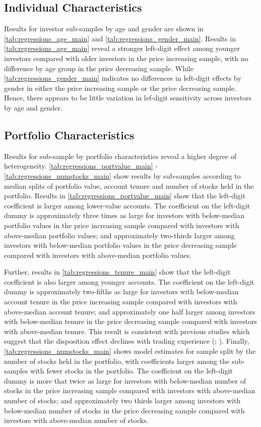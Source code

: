 \subsection{Individual Characteristics}

Results for investor sub-samples by age and gender are shown in \ref{tab:regressions_age_main} and \ref{tab:regressions_gender_main}. Results in \ref{tab:regressions_age_main} reveal a stronger left-digit effect among younger investors compared with older investors in the price increasing sample, with no difference by age group in the price decreasing sample. While \ref{tab:regressions_gender_main} indicates no differences in left-digit effects by gender in either the price increasing sample or the price decreasing sample. Hence, there appears to be little variation in lef-digit sensitivity across investors by age and gender.

\subsection{Portfolio Characteristics}

Results for sub-sample by portfolio characteristics reveal a higher degree of heterogeneity. \ref{tab:regressions_portvalue_main} - \ref{tab:regressions_numstocks_main} show results by sub-samples according to median splits of portfolio value, account tenure and number of stocks held in the portfolio. Results in \ref{tab:regressions_portvalue_main} show that the left-digit coefficient is larger among lower-value accounts. The coefficient on the left-digit dummy is approximately three times as large for investors with below-median portfolio values in the price increasing sample compared with investors with above-median portfolio values; and approximately two-thirds larger among investors with below-median portfolio values in the price decreasing sample compared with investors with above-median portfolio values.

Further, results in \ref{tab:regressions_tenure_main} show that the left-digit coefficient is also larger among younger accounts. The coefficient on the left-digit dummy is approximately two-fifths as large for investors with below-median account tenure in the price increasing sample compared with investors with above-median account tenure; and approximately one half larger among investors with below-median tenure in the price decreasing sample compared with investors with above-median tenure. This result is consistent with previous studies which suggest that the disposition effect declines with trading experience (\citealp{feng2005}; \citealp{seru2010}). Finally, \ref{tab:regressions_numstocks_main} shows model estimates for sample split by the number of stocks held in the portfolio, with coefficients larger among the sub-samples with fewer stocks in the portfolio. The coefficient on the left-digit dummy is more that twice as large for investors with below-median number of stocks in the price increasing sample compared with investors with above-median number of stocks; and approximately two thirds larger among investors with below-median number of stocks in the price decreasing sample compared with investors with above-median number of stocks. 

